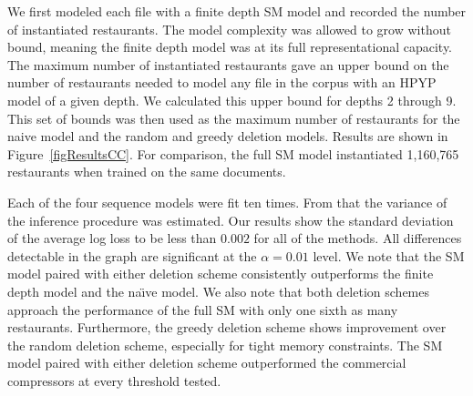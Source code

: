 
We first modeled each file with a finite depth SM model and recorded the number of instantiated restaurants.  The model complexity was allowed to grow without bound, meaning the finite depth model was at its full representational capacity.  The maximum number of instantiated restaurants gave an upper bound on the number of restaurants needed to model any file in the corpus with an HPYP model of a given depth.  We calculated this upper bound for depths 2 through 9.  This set of bounds was then used as the maximum number of restaurants for the naive model and the random and greedy deletion models.  Results are shown in Figure~\ref{figResultsCC}.  For comparison, the full SM model instantiated 1,160,765 restaurants when trained on the same documents.  

Each of the four sequence models were fit ten times.  From that the variance of the inference procedure was estimated.  Our results show the standard deviation of the average log loss to be less than $0.002$ for all of the methods.  All differences detectable in the graph are significant at the $\alpha = 0.01$ level. We note that the SM model paired with either deletion scheme consistently outperforms the finite depth model and the na\"{\i}ve model.  We also note that both deletion schemes approach the performance of the full SM with only one sixth as many restaurants.  Furthermore, the greedy deletion scheme shows improvement over the random deletion scheme, especially for tight memory constraints.  The SM model paired with either deletion scheme outperformed the commercial compressors at every threshold tested.
